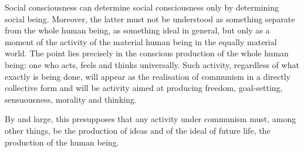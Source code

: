 \documentclass[../main]{subfiles}
\begin{document}
Social consciousness can determine social consciousness only by determining social being. Moreover, the latter must not be understood as something separate from the whole human being, as something ideal in general, but only as a moment of the activity of the material human being in the equally material world. The point lies precisely in the conscious production of the whole human being: one who acts, feels and thinks universally. Such activity, regardless of what exactly is being done, will appear as the realisation of communism in a directly collective form and will be activity aimed at producing freedom, goal-setting, sensuousness, morality and thinking.

By and large, this presupposes that any activity under communism must, among other things, be the production of ideas and of the ideal of future life, the production of the human being.
\end{document}

